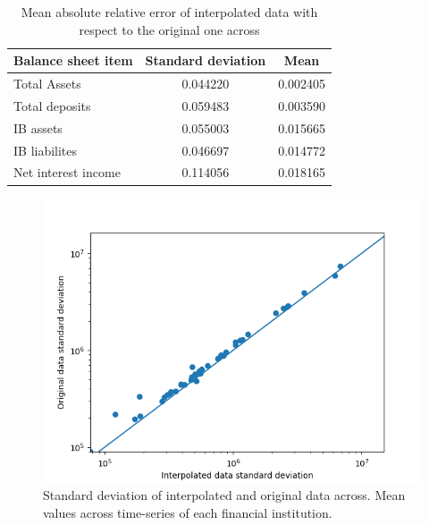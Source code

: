 \documentclass[12pt]{article}
\begin{document}
\begin{table}
\begin{tabular}{l|c|c}
		Balance sheet item  & Standard deviation & Mean \\
		\hline
		Total Assets & 0.044220 & 0.002405 \\
		Total deposits & 0.059483 & 0.003590 \\
		IB assets & 0.055003 & 0.015665 \\
		IB liabilites & 0.046697 & 0.014772 \\
		Net interest income & 0.114056 & 0.018165 \\
\end{tabular}
	\caption{Mean absolute relative error of interpolated data with respect to the original one across}
\label{table:interpolation_error}
\end{table}

\begin{figure}[!htbp]
	\centering
	\includegraphics[scale = 0.7]{img/std_nii.png}
	\caption{Standard deviation of interpolated and original data across. Mean values across time-series of each financial institution.}
	\label{figure:interpolation}
\end{figure}
\end{document}
